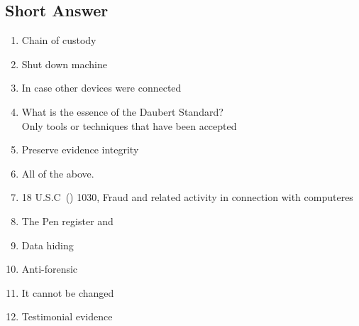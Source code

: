 \subsection{Short Answer}
\begin{enumerate}
    \item Chain of custody
    \item Shut down machine
    \item In case other devices were connected
    \item What is the essence of the Daubert Standard?\\Only tools or techniques that have been accepted
    \item Preserve evidence integrity
    \item All of the above.
    \item 18 U.S.C\ () 1030, Fraud and related activity in connection with computeres
    \item The Pen register and 
    \item Data hiding
    \item Anti-forensic
    \item It cannot be changed
    \item Testimonial evidence
\end{enumerate}